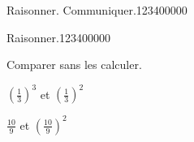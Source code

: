\begin{pageAD}
\begin{ExoCad}{Raisonner. Communiquer.}{1234}{0}{0}{0}{0}{0}

%
%
%
%
%
%

\end{ExoCad} 

\begin{ExoCad}{Raisonner.}{1234}{0}{0}{0}{0}{0}

Comparer sans les calculer.

\begin{description}[leftmargin=*]
\item $(\frac{1}{3})^3$ et $(\frac{1}{3})^2$  




\item $\frac{10}{9}$ et $(\frac{10}{9})^2$



\end{description}

\end{ExoCad} 

 
\end{pageAD} %


